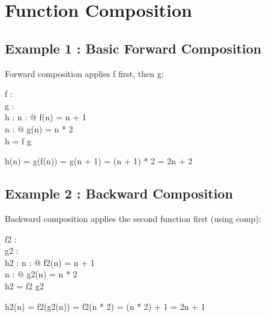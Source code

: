 \documentclass[a4paper,10pt,fleqn]{article}
\begin{document}
\section*{Function Composition}

\begin{zed}
\end{zed}

\subsection*{Example 1 : Basic Forward Composition}

\noindent Forward composition applies f first, then g:

\bigskip

\begin{axdef}
f : \nat \fun \nat \\
g : \nat \fun \nat \\
h : \nat \fun \nat
\where
\forall n : \nat @ f(n) = n + 1 \\
\forall n : \nat @ g(n) = n * 2 \\
h = f \comp g
\end{axdef}

\noindent h(n) = g(f(n)) = g(n + 1) = (n + 1) * 2 = 2n + 2

\bigskip

\subsection*{Example 2 : Backward Composition}

\noindent Backward composition applies the second function first (using comp):

\bigskip

\begin{axdef}
f2 : \nat \fun \nat \\
g2 : \nat \fun \nat \\
h2 : \nat \fun \nat
\where
\forall n : \nat @ f2(n) = n + 1 \\
\forall n : \nat @ g2(n) = n * 2 \\
h2 = f2 \comp g2
\end{axdef}

\noindent h2(n) = f2(g2(n)) = f2(n * 2) = (n * 2) + 1 = 2n + 1
\end{document}
